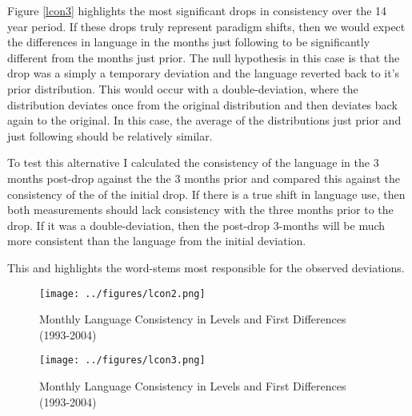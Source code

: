Figure \ref{lcon3} highlights the most significant drops in consistency over the 14 year period. If these drops truly represent paradigm shifts, then we would expect the differences in language in the months just following to be significantly different from the months just prior. The null hypothesis in this case is that the drop was a simply a temporary deviation and the language reverted back to it's prior distribution. This would occur with a double-deviation, where the distribution deviates once from the original distribution and then deviates back again to the original. In this case, the average of the distributions just prior and just following should be relatively similar.

To test this alternative I calculated the consistency of the language in the 3 months post-drop against the the 3 months prior and compared this against the consistency of the of the initial drop. If there is a true shift in language use, then both measurements should lack consistency with the three months prior to the drop. If it was a double-deviation, then the post-drop 3-months will be much more consistent than the language from the initial deviation.
 
This and highlights the word-stems most responsible for the observed deviations.

\begin{landscape}
\begin{figure}[p!]
\begin{center}
\texttt{[image: ../figures/lcon2.png]}
\caption[Monthly Language Consistency, Levels and Differences (1993-2004)]{Monthly Language Consistency in Levels and First Differences (1993-2004)\label{lcon2}}
\end{center}
\end{figure}
\end{landscape}

\begin{landscape}
\begin{figure}[p!]
\begin{center}
\texttt{[image: ../figures/lcon3.png]}
\caption[Monthly Language Consistency, Levels and Differences (1993-2004)]{Monthly Language Consistency in Levels and First Differences (1993-2004)\label{lcon2}}
\end{center}
\end{figure}
\end{landscape}


